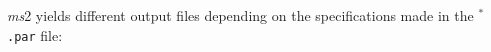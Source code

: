 

%
%
%


\textit{ms}2 yields different output files depending on the specifications made in the \texttt{$^{*}$\hspace{-3pt}.par} file:
